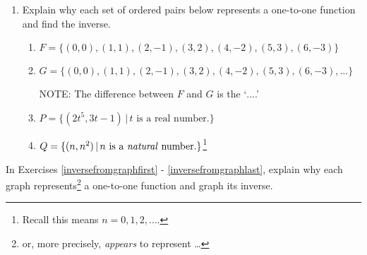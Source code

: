 \begin{enumerate}
\setcounter{enumi}{\value{HW}}

\item  Explain why each set of ordered pairs  below represents a  one-to-one function and find the inverse.


\begin{enumerate}

\item  $F = \{ (0,0), (1,1), (2,-1), (3,2), (4,-2), (5,3), (6,-3)  \}$

\item  $G = \{ (0,0), (1,1), (2,-1), (3,2), (4,-2), (5,3), (6,-3), \ldots \}$  

NOTE:  The difference between $F$ and $G$ is the  `$\ldots$.'  

\item  $P = \{ (2t^5, 3t-1) \, | \, \text{$t$ is a real number.} \}$

\item  $Q = \{ (n, n^2) \, | \, \text{$n$ is a \textit{natural} number.} \}$\footnote{Recall this means $n = 0, 1, 2, \ldots$.}

\end{enumerate}

\setcounter{HW}{\value{enumi}}
\end{enumerate}

\newpage

In Exercises \ref{inversefromgraphfirst} - \ref{inversefromgraphlast}, explain why each graph  represents\footnote{or, more precisely, \textit{appears} to represent \ldots}  a one-to-one function and graph its inverse.


